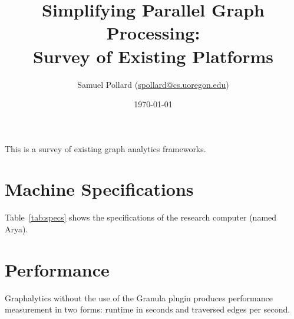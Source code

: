 \documentclass[11pt]{article}
\begin{document}
\title{Simplifying Parallel Graph Processing: \\
	\large Survey of Existing Platforms
}
\author{Samuel Pollard (\href{mailto:spollard@cs.uoregon.edu}{spollard@cs.uoregon.edu})}
\date{\today}
\maketitle

This is a survey of existing graph analytics frameworks.

\section{Machine Specifications}
Table~\ref{tab:specs} shows the specifications of the research computer (named Arya).

\begin{table}[!htb]
	\centering

	\caption{Machine specifications.}
	\label{tab:specs}
\end{table}


\section{Performance}
Graphalytics without the use of the Granula plugin produces performance measurement in two forms: runtime in seconds and traversed edges per second.
\end{document}

